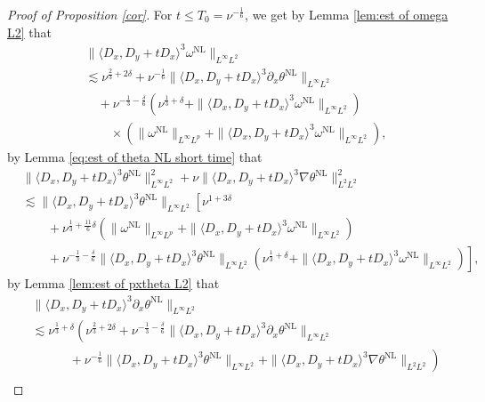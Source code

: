 \documentclass[reqno, 12pt]{amsart} %
\theoremstyle{plain} %
\theoremstyle{definition}
\theoremstyle{remark}
\numberwithin{equation}{section} %
\newcommand{\lt}{\left}
\newcommand{\rt}{\right}
\newcommand{\px}{\partial_x}
\begin{document}
	\begin{proof}[Proof of Proposition \ref{cor}] For $t\leq T_0=\nu^{-\frac16}$, we get by Lemma \ref{lem:est of omega L2} that
		\begin{equation*}
			\begin{aligned}
				& \|\langle D_x, D_y+t D_x\rangle^3 \omega^{\mathrm{NL}}\|_{L^\infty L^2}\\ &\lesssim  \nu^{\frac23 + 2\delta}  +    \nu^{-\frac16} \|\langle D_x, D_y+t D_x\rangle^3 \px \theta^{\mathrm{NL}}\|_{L^\infty L^2}    \\
				& \quad + \nu^{-\frac13 -\frac\delta6 }(  \nu^{\frac13 + \delta} +\|\langle D_x, D_y+t D_x\rangle^3 \omega^{\mathrm{NL}}\|_{L^\infty L^2}) \\
				&\qquad \times 
				(\|\omega^{\mathrm{NL}}\|_{L^\infty L^p}+\|\langle D_x, D_y+t D_x\rangle^3 \omega^{\mathrm{NL}}\|_{L^\infty L^2}) ,
			\end{aligned}
		\end{equation*}
		by Lemma \ref{eq:est of theta NL short time} that
		$$
		\begin{aligned}
			& \|\langle D_x, D_y+t D_x\rangle^3 \theta^{\mathrm{NL}}\|_{L^\infty L^2}^2 + \nu \|\langle D_x, D_y+t D_x\rangle^3 \nabla \theta^{\mathrm{NL}}\|_{L^2 L^2}^2 \\ &\lesssim\|\langle D_x, D_y+t D_x\rangle^3 \theta^{\mathrm{NL}}\|_{L^\infty L^2} \lt[ \nu^{1 + 3\delta} \rt. \\
			& \lt. \qquad
			+ \nu^{\frac13 + \frac{11}{6}\delta} (\|\omega^{\mathrm{NL}}\|_{L^\infty L^p}+\|\langle D_x, D_y+t D_x\rangle^3 \omega^{\mathrm{NL}}\|_{L^\infty L^2}) 
			\rt.  \\
			& \left.\quad \quad  + \nu^{-\frac13 -\frac\delta6 } \|\langle D_x, D_y+t D_x\rangle^3 \theta^{\mathrm{NL}}\|_{L^\infty L^2}(\nu^{\frac13 + \delta}  + \|\langle D_x, D_y+t D_x\rangle^3 \omega^{\mathrm{NL}}\|_{L^\infty L^2} ) \rt],
		\end{aligned}
		$$
		by Lemma \ref{lem:est of pxtheta L2} that
		\begin{equation*}\begin{aligned} 
				&  \|\langle D_x, D_y+t D_x\rangle^3 \px \theta^{\mathrm{NL}}\|_{L^\infty L^2} \\
				&\lesssim  \nu^{\frac13 + \delta} \lt( \nu^{\frac23 + 2\delta} + \nu^{-\frac13 -\frac\delta6 } \|\langle D_x, D_y+t D_x\rangle^3 \px \theta^{\mathrm{NL}}\|_{L^\infty L^2}  \rt.\\
				&\lt. \qquad \quad +   \nu^{-\frac16}\|\langle D_x, D_y+t D_x\rangle^3 \theta^{\mathrm{NL}}\|_{L^\infty L^2}  +   \|\langle D_x, D_y+t D_x\rangle^3 \nabla \theta^{\mathrm{NL}}\|_{L^2 L^2} \rt)   \\

\end{aligned}
\end{equation*}
\end{proof}
\end{document}
